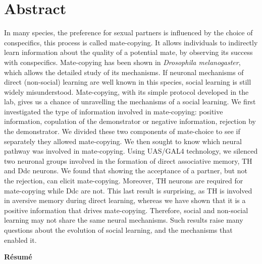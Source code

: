\documentclass[a4paper, 12pt]{article}
\begin{document}
\clearpage
	
	
	\vspace*{2cm}
	\tableofcontents
	
	\clearpage

\section{Abstract}
\begin{singlespace}
In many species, the preference for sexual partners is influenced by the choice of 
conspecifics, this process is called mate-copying. It allows individuals to indirectly learn information about the quality of a potential mate, by observing its success with conspecifics. Mate-copying has been shown in \textit{Drosophila melanogaster}, which allows the detailed study of its mechanisms. If neuronal mechanisms of direct (non-social) learning are well known in this species, social learning is still widely misunderstood. Mate-copying, with its simple protocol developed in the lab, gives us a chance of unravelling the mechanisms of a social learning. We first investigated the type of information involved in mate-copying: positive information, copulation of the demonstrator or negative information, rejection by the demonstrator. We divided these two components of mate-choice to see if separately they allowed mate-copying. We then sought to know which neural pathway was involved in mate-copying. Using UAS/GAL4 technology, we silenced two neuronal groups involved in the formation of direct associative memory, TH and Ddc neurons. We found that showing the acceptance of a partner, but not the rejection, can elicit mate-copying. Moreover, TH neurons are required for mate-copying while Ddc are not. This last result is surprising, as TH is involved in aversive memory during direct learning, whereas we have shown that it is a positive information that drives mate-copying. Therefore, social and non-social learning may not share the same neural mechanisms. Such results raise many questions about the evolution of social learning, and the mechanisms that enabled it.
\end{singlespace}
\medskip
\begin{large}
\textbf{Résumé}
\end{large}
\end{document}
